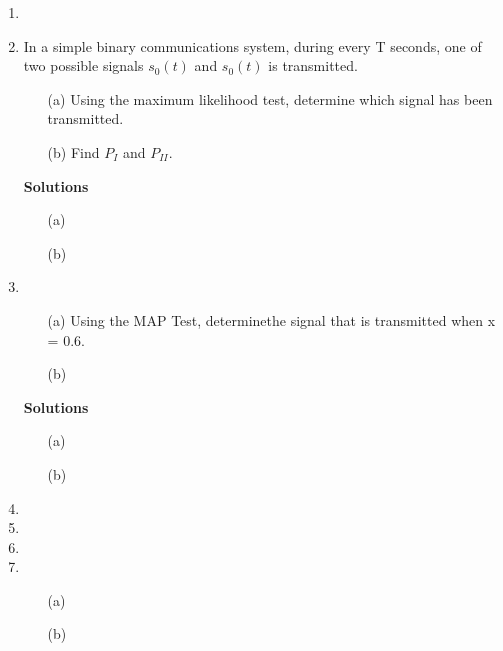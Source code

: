 \begin{enumerate}
\item

\item

In a simple binary communications system, during every T seconds, one of two possible signals $s_0(t)$ and
$s_0(t)$ is transmitted.

\begin{itemize}
\item[(a)] Using the maximum likelihood test, determine which signal has been transmitted.
\item[(b)] Find $P_{I}$ and $P_{II}$.
\end{itemize}

\noindent \textbf{Solutions}
\begin{itemize}
\item[(a)]
\item[(b)]
\end{itemize}


\item 


\begin{itemize}
\item[(a)] Using the MAP Test, determinethe signal that is transmitted when x = 0.6.
\item[(b)]
\end{itemize}

\noindent \textbf{Solutions}
\begin{itemize}
\item[(a)]
\item[(b)]
\end{itemize}

\item

\item


\item



\item 

\begin{itemize}
\item[(a)]
\item[(b)]
\end{itemize}


\end{enumerate}

